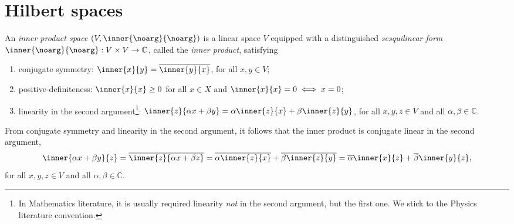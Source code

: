 \chapter{Hilbert spaces}
An \emph{inner product space} \((V, \inner{\noarg}{\noarg})\) is a linear space \(V\) equipped with a distinguished \emph{sesquilinear form} \(\inner{\noarg}{\noarg} : V \times V \to \mathbb{C}\), called the \emph{inner product}, satisfying
\begin{enumerate}[label=(\alph*)]
    \item conjugate symmetry: \(\inner{x}{y} = \conj{\inner{y}{x}}\), for all \(x, y \in V\);
    \item positive-definiteness: \(\inner{x}{x} \geq 0\) for all \(x \in X\) and \(\inner{x}{x} = 0 \iff x = 0\);
    \item linearity in the second argument\footnote{In Mathematics literature, it is usually required linearity \emph{not} in the second argument, but the first one. We stick to the Physics literature convention.}: \(\inner{z}{\alpha x + \beta y} = \alpha \inner{z}{x} + \beta \inner{z}{y}\), for all \(x, y, z \in V\) and all \(\alpha, \beta \in \mathbb{C}\).
\end{enumerate}
From conjugate symmetry and linearity in the second argument, it follows that the inner product is conjugate linear in the second argument,
\begin{equation*}
    \inner{\alpha x + \beta y}{z} = \conj{\inner{z}{\alpha x + \beta z}} = \conj{\alpha\inner{z}{x}} + \conj{\beta\inner{z}{y}} = \conj{\alpha} \inner{x}{z} + \conj{\beta} \inner{y}{z},
\end{equation*}
for all \(x,y,z \in V\) and all \(\alpha, \beta \in \mathbb{C}\).

